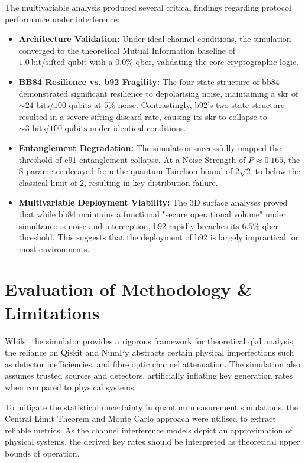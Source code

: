 The multivariable analysis produced several critical findings regarding protocol performance under interference:

\begin{itemize}
    \item \textbf{Architecture Validation:} Under ideal channel conditions, the simulation converged to the theoretical Mutual Information baseline of $1.0\ \text{bit/sifted qubit}$ with a $0.0\%$ \gls{qber}, validating the core cryptographic logic.
    \item \textbf{BB84 Resilience vs. \gls{b92} Fragility:} The four-state structure of \gls{bb84} demonstrated significant resilience to depolarising noise, maintaining a \gls{skr} of $\sim24 \text{ bits/100 qubits}$ at $5\%$ noise. Contrastingly, \gls{b92}'s two-state structure resulted in a severe sifting discard rate, causing its \gls{skr} to collapse to $\sim3 \text{ bits/100 qubits}$ under identical conditions.
    \item \textbf{Entanglement Degradation:} The simulation successfully mapped the threshold of \gls{e91} entanglement collapse. At a Noise Strength of $P \approx 0.165$, the S-parameter decayed from the quantum Tsirelson bound of $2\sqrt{2}$ to below the classical limit of $2$, resulting in key distribution failure.
    \item \textbf{Multivariable Deployment Viability:} The 3D surface analyses proved that while \gls{bb84} maintains a functional "secure operational volume" under simultaneous noise and interception, \gls{b92} rapidly breaches its $6.5\%$ \gls{qber} threshold. This suggests that the deployment of \gls{b92} is largely impractical for most environments.
\end{itemize}


\section{Evaluation of Methodology \& Limitations}
\label{sec:eval}


Whilst the simulator provides a rigorous framework for theoretical \gls{qkd} analysis, the reliance on Qiskit and NumPy abstracts certain physical imperfections such as detector inefficiencies, and fibre optic channel attenuation. The simulation also assumes trusted sources and detectors, artificially inflating key generation rates when compared to physical systems.


To mitigate the statistical uncertainty in quantum measurement simulations, the Central Limit Theorem and Monte Carlo approach were utilised to extract reliable metrics. As the channel interference models depict an approximation of physical systems, the derived key rates should be interpreted as theoretical upper bounds of operation.



